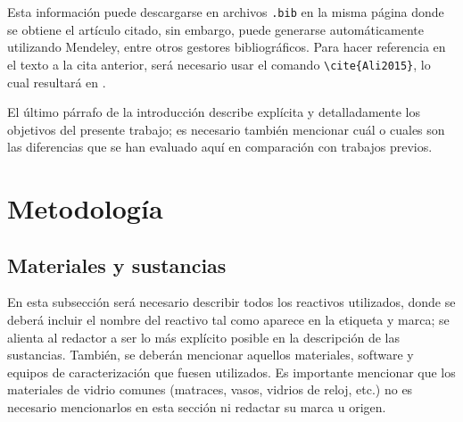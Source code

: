 \documentclass[fleqn,10pt]{SelfArx} %
\begin{document}
Esta información puede descargarse en archivos \texttt{.bib} en la misma página donde se obtiene el artículo citado, sin embargo, puede generarse automáticamente utilizando Mendeley, entre otros gestores bibliográficos. Para hacer referencia en el texto a la cita anterior, será necesario usar el comando \verb|\cite{Ali2015}|, lo cual resultará en \cite{Ali2015}.%

El último párrafo de la introducción describe explícita y detalladamente los objetivos del presente trabajo; es necesario también mencionar cuál o cuales son las diferencias que se han evaluado aquí en comparación con trabajos previos.



\section{Metodología} %

\subsection{Materiales y sustancias}

En esta subsección será necesario describir todos los reactivos utilizados, donde se deberá incluir el nombre del reactivo tal como aparece en la etiqueta y marca; se alienta al redactor a ser lo más explícito posible en la descripción de las sustancias. También, se deberán mencionar aquellos materiales, software y equipos de caracterización que fuesen utilizados. Es importante mencionar que los materiales de vidrio comunes (matraces, vasos, vidrios de reloj, etc.) no es necesario mencionarlos en esta sección ni redactar su marca u origen.
\end{document}
